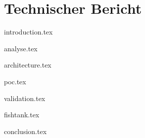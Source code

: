 \part{Technischer Bericht}

{introduction.tex}

{analyse.tex}

{architecture.tex}

{poc.tex}

{validation.tex}

{fishtank.tex}

{conclusion.tex}